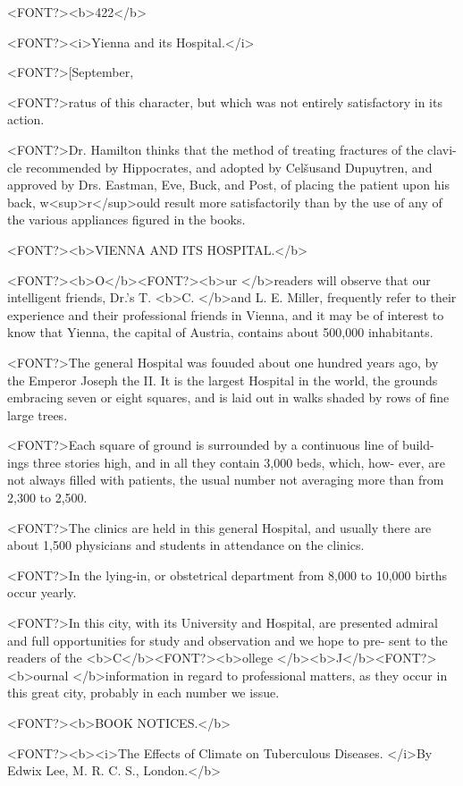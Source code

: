<FONT?><b>422</b>

<FONT?><i>Yienna and its Hospital.</i>

<FONT?>[September,

<FONT?>ratus of this character, but which was not entirely satisfactory in its
action.

<FONT?>Dr. Hamilton thinks that the method of treating fractures of the clavi-
cle recommended by Hippocrates, and adopted by Celšusand Dupuytren,
and approved by Drs. Eastman, Eve, Buck, and Post, of placing the
patient upon his back, w<sup>r</sup>ould result more satisfactorily than by the use
of any of the various appliances figured in the books.

<FONT?><b>VIENNA AND ITS HOSPITAL.</b>

<FONT?><b>O</b><FONT?><b>ur </b>readers will observe that our intelligent friends, Dr.'s T. <b>C. </b>and
L. E. Miller, frequently refer to their experience and their professional
friends in Vienna, and it may be of interest to know that Yienna, the
capital of Austria, contains about 500,000 inhabitants.

<FONT?>The general Hospital was fouuded about one hundred years ago, by
the Emperor Joseph the II. It is the largest Hospital in the world,
the grounds embracing seven or eight squares, and is laid out in walks
shaded by rows of fine large trees.

<FONT?>Each square of ground is surrounded by a continuous line of build-
ings three stories high, and in all they contain 3,000 beds, which, how-
ever, are not always filled with patients, the usual number not averaging
more than from 2,300 to 2,500.

<FONT?>The clinics are held in this general Hospital, and usually there are
about 1,500 physicians and students in attendance on the clinics.

<FONT?>In the lying-in, or obstetrical department from 8,000 to 10,000 births
occur yearly.

<FONT?>In this city, with its University and Hospital, are presented admiral
and full opportunities for study and observation and we hope to pre-
sent to the readers of the <b>C</b><FONT?><b>ollege </b><b>J</b><FONT?><b>ournal </b>information in regard to
professional matters, as they occur in this great city, probably in each
number we issue.

<FONT?><b>BOOK NOTICES.</b>

<FONT?><b><i>The Effects of Climate on Tuberculous Diseases.   </i>By Edwix Lee, M. R. C. S., London.</b>


